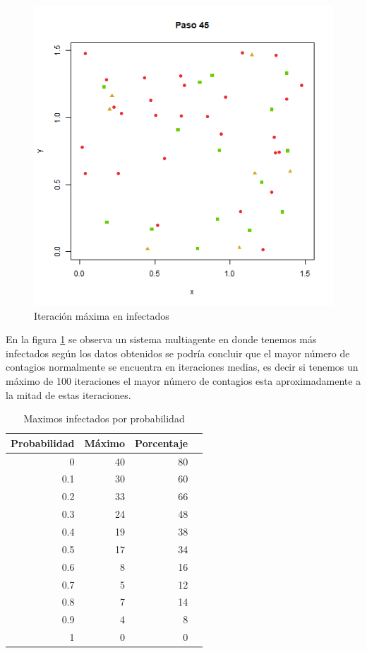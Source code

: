 \documentclass{article}
\begin{document}
\begin{figure}[H]
       \begin{center}
           \includegraphics[width=13cm]{p6_t_t.png}
\end{center}
\caption{Iteraci\'on m\'axima en infectados}
        \label{f2}
\end{figure}
 
En la figura \ref{f2} se observa un sistema multiagente en donde tenemos m\'as infectados seg\'un los datos obtenidos se podr\'ia concluir que el mayor n\'umero de contagios normalmente se encuentra en iteraciones medias, es decir si tenemos un m\'aximo de 100 iteraciones el mayor n\'umero de contagios esta aproximadamente a la mitad de estas iteraciones.

\begin{table}[H]
\centering
\caption{Maximos infectados por probabilidad}
\begin{tabular}{rrrr}
  \hline
 Probabilidad & M\'aximo & Porcentaje \\ 
  \hline
0 & 40 & 80 \\ 
 0.1 &30  & 60 \\ 
 0.2 & 33&66  \\ 
 0.3 & 24& 48 \\ 
 0.4 &19 & 38\\ 
 0.5 &  17& 34 \\ 
 0.6 & 8 &16 \\ 
 0.7 &  5&12 \\
 0.8 & 7 &14 \\
 0.9 &4  & 8 \\
 1 & 0& 0\\
   \hline
\end{tabular}
\label{t1}
\end{table}
\end{document}
